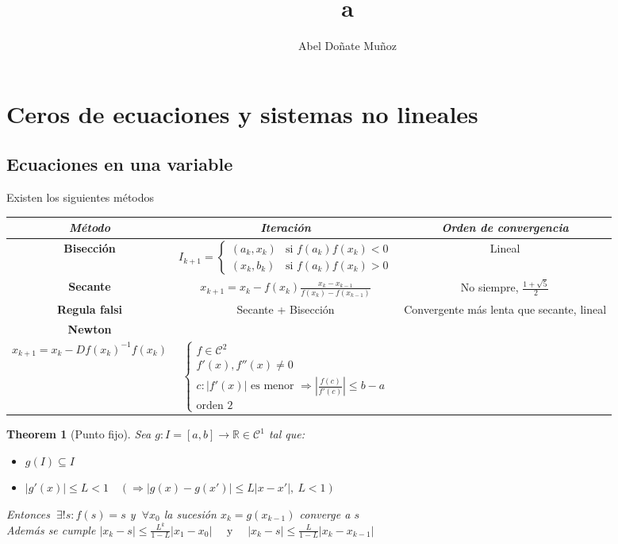 \documentclass[leqno]{article}
\title{a}
\author{Abel Doñate Muñoz}
\date{}
\newtheorem*{theorem}{Theorem}
\begin{document}
\maketitle
\tableofcontents
\newpage

\section{Ceros de ecuaciones y sistemas no lineales}
\subsection{Ecuaciones en una variable}
Existen los siguientes métodos
\begin{center}
\begin{tabular}{|c|c|c|}
  \hline
  \textit{Método} & \textit{Iteración} &  \textit{Orden de convergencia} \\
\hline
  \textbf{Bisección} &
  $I_{k+1} = \begin{cases}
	(a_k, x_k) &\text{si } f(a_k)f(x_k)<0\\
	(x_k, b_k) &\text{si } f(a_k)f(x_k)>0
  \end{cases}$ & Lineal \\
\hline
  \textbf{Secante} & $\displaystyle x_{k+1} = x_k-f(x_k) \frac{x_k - x_{k-1}}{f(x_k) - f(x_{k-1})}$ & No siempre, $\frac{1+\sqrt{5} }{2}$ \\
\hline
  \textbf{Regula falsi} & Secante + Bisección & Convergente más lenta que secante, lineal \\
\hline
  \textbf{Newton} & \makecell{
    $\displaystyle x_{k+1}  = x_k - \frac{f(x_k)}{f'(x_k)}$\\
    $\displaystyle x_{k+1}  = x_k - Df(x_k)^{-1}f(x_k)$
  }
  & $\begin{cases}
  f\in \mathcal{C}^2\\
  f'(x), f''(x)\neq 0 \\
  c:|f'(x)| \text{ es menor } \Rightarrow |\frac{f(c)}{f'(c)}|\le b-a \\
  \text{orden }2
  \end{cases}$ \\
  \hline
\end{tabular}
\end{center}

\begin{theorem}[Punto fijo] Sea $g: I = [a, b] \to  \mathbb{R} \in \mathcal{C}^1$ tal que:
  \begin{itemize}[topsep=-6pt, itemsep=0pt]
    \item $g(I)\subseteq I$
	\item $|g'(x)|\le L <1 \quad (\Rightarrow |g(x)-g(x')|\le L|x-x'|, \ L<1)$
  \end{itemize}
  Entonces $\ \exists ! s: f(s)=s$ y $\ \forall x_0$ la sucesión $x_k = g(x_{k-1})$ converge a $s$ \\
  Además se cumple $\displaystyle |x_k-s|\le \frac{L^k}{1-L}|x_1-x_0| \quad \text{ y }\quad |x_k-s|\le \frac{L}{1-L}|x_k-x_{k-1}|$

\end{theorem}
\end{document}
